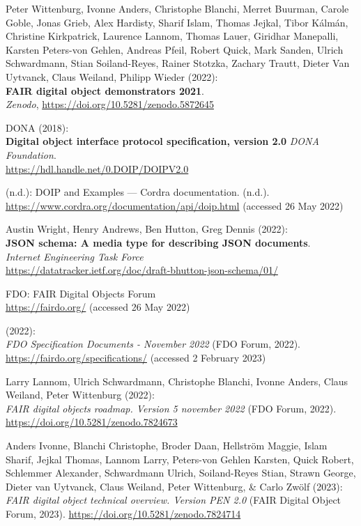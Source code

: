 \begin{thebibliography}{9}
Peter Wittenburg, Ivonne Anders, Christophe Blanchi, Merret Buurman,
Carole Goble, Jonas Grieb, Alex Hardisty, Sharif Islam, Thomas Jejkal,
Tibor Kálmán, Christine Kirkpatrick, Laurence Lannom, Thomas Lauer,
Giridhar Manepalli, Karsten Peters-von Gehlen, Andreas Pfeil, Robert
Quick, Mark Sanden, Ulrich Schwardmann, Stian Soiland-Reyes, Rainer
Stotzka, Zachary Trautt, Dieter Van Uytvanck, Claus Weiland, Philipp
Wieder (2022): \\
\textbf{FAIR digital object demonstrators 2021}.\\
\emph{Zenodo},
\url{https://doi.org/10.5281/zenodo.5872645}

DONA (2018): \\
\textbf{Digital object interface protocol specification, version 2.0} 
\emph{DONA Foundation}.\\
\url{https://hdl.handle.net/0.DOIP/DOIPV2.0}

(n.d.): {DOIP} and {Examples} --- {Cordra} documentation. (n.d.).
\url{https://www.cordra.org/documentation/api/doip.html} (accessed 26
May 2022)

Austin Wright, Henry Andrews, Ben Hutton, Greg Dennis (2022):\\
\textbf{JSON schema: A media type for describing JSON documents}.\\
\emph{Internet Engineering Task Force}\\
\url{https://datatracker.ietf.org/doc/draft-bhutton-json-schema/01/}

FDO: {FAIR Digital Objects Forum} \\
\url{https://fairdo.org/} (accessed 26 May 2022)

(2022): \\
\emph{{FDO Specification Documents - November 2022}} ({FDO
Forum}, 2022). \url{https://fairdo.org/specifications/} (accessed 2
February 2023)

Larry Lannom, Ulrich Schwardmann, Christophe Blanchi, Ivonne Anders,
Claus Weiland, Peter Wittenburg (2022): \\
\emph{FAIR digital objects
roadmap. Version 5 november 2022} ({FDO Forum}, 2022).
\url{https://doi.org/10.5281/zenodo.7824673}

Anders Ivonne, Blanchi Christophe, Broder Daan, Hellström Maggie, Islam
Sharif, Jejkal Thomas, Lannom Larry, Peters-von Gehlen Karsten, Quick
Robert, Schlemmer Alexander, Schwardmann Ulrich, Soiland-Reyes Stian,
Strawn George, Dieter van Uytvanck, Claus Weiland, Peter Wittenburg, \&
Carlo Zwölf (2023): \\
\emph{{FAIR} digital object technical overview.
Version PEN 2.0} ({FAIR Digital Object Forum}, 2023).
\url{https://doi.org/10.5281/zenodo.7824714}


\end{thebibliography}

